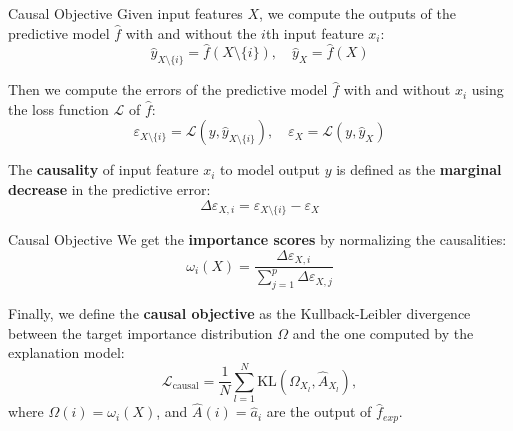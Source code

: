 \documentclass[10pt]{beamer}
\begin{document}
\begin{frame}{Causal Objective}
Given input features $X$, we compute the outputs of the predictive model $\hat{f}$ with and without the $i$th input feature $x_i $:
\begin{equation}
\hat{y}_{X\setminus\{i\}} = \hat{f}(X\setminus \{i\}), \quad \hat{y}_{X} = \hat{f}(X)
\end{equation}

Then we compute the errors of the predictive model $\hat{f}$ with and without $x_i $ using the loss function $\mathcal{L}$ of $\hat{f}$:
\begin{equation}
\varepsilon_{X\setminus\{i\}} = \mathcal{L}(y, \hat{y}_{X\setminus\{i\}}), \quad \varepsilon_{X} = \mathcal{L}(y, \hat{y}_X)
\end{equation}

The \textbf{causality} of input feature $x_i $ to model output $y$ is defined as the \textbf{marginal decrease} in the predictive error:
\begin{equation}
\Delta\varepsilon_{X, i} = \varepsilon_{X\setminus\{i\}} - \varepsilon_{X}
\end{equation}
\end{frame}

\begin{frame}{Causal Objective}
We get the \textbf{importance scores} by normalizing the causalities:
\begin{equation}
\omega_i(X) = \frac{\Delta\varepsilon_{X, i}}{\sum_{j=1}^{p}\Delta\varepsilon_{X, j}}
\end{equation}

Finally, we define the \textbf{causal objective} as the Kullback-Leibler divergence between the target importance distribution $\Omega$ and the one computed by the explanation model:
\begin{equation}
\mathcal{L}_{\text{causal}} = \frac{1}{N}\sum_{l=1}^{N}\text{KL}(\Omega_{X_l}, \hat{A}_{X_l}),
\end{equation}
where $\Omega(i) = \omega_i(X)$, and $\hat{A}(i) = \hat{a}_i$ are the output of $\hat{f}_{exp} $.

\end{frame}
\end{document}

